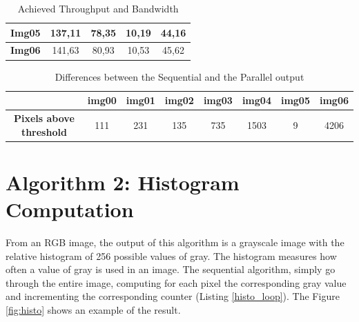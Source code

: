 \documentclass[a4paper]{article}
\begin{document}
\begin{table}[!ht]
\begin{tabular}{|c|c|c|c|c|}
\textbf{Img05} & 137,11                                                                            & 78,35                                                                         & 10,19                                                                        & 44,16                                                                          \\ \hline
\textbf{Img06} & 141,63                                                                            & 80,93                                                                         & 10,53                                                                        & 45,62                                                                          \\ \hline
\end{tabular}
\caption{Achieved Throughput and Bandwidth}
\label{tab:darker_t_b}
\end{table}
\FloatBarrier

\begin{table}[!ht]
\centering
\begin{tabular}{|c|l|c|c|l|l|l|l|}
\hline
\textbf{}                        & \textbf{img00}           & \textbf{img01} & \textbf{img02} & \textbf{img03}           & \textbf{img04}            & \textbf{img05}         & \textbf{img06}            \\ \hline
\textbf{Pixels above  threshold} & \multicolumn{1}{c|}{111} & 231            & 135            & \multicolumn{1}{c|}{735} & \multicolumn{1}{c|}{1503} & \multicolumn{1}{c|}{9} & \multicolumn{1}{c|}{4206} \\ \hline
\end{tabular}
\caption{Differences between the Sequential and the Parallel output}
\label{tab:pxabd}
\end{table}


\section{Algorithm 2: Histogram Computation}
\label{sec:hc}
From an RGB image, the output of this algorithm is a grayscale image with the relative histogram of 256 possible values of gray.
The histogram measures how often a value of gray is used in an image. The sequential algorithm, simply go through the entire image, computing for each pixel the corresponding gray value and incrementing the corresponding counter (Listing \ref{histo_loop}). The Figure \ref{fig:histo} shows an example of the result.
\end{document}
